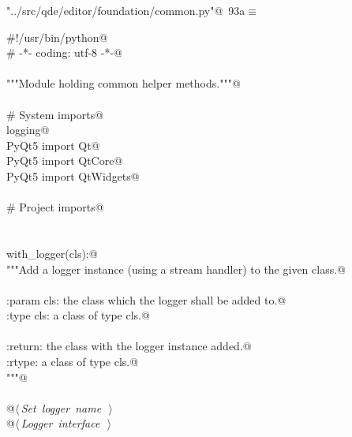 \documentclass[
    a4paper,      %
    10pt,         %
    openright,    %
    notitlepage,  %
    parskip=half, %
]{scrreprt}       %
\theoremstyle{definition}                    %
\begin{document}
\begin{flushleft} \small
\begin{minipage}{\linewidth}\label{scrap148}\raggedright\small
{} \verb@"../src/qde/editor/foundation/common.py"@\nobreak\ {\footnotesize {93a}}$\equiv$
\vspace{-1ex}
\begin{list}{}{} \item
\mbox{}\lstinline@#!/usr/bin/python@\\
\mbox{}\lstinline@# -*- coding: utf-8 -*-@\\
\mbox{}\lstinline@@\\
\mbox{}\lstinline@"""Module holding common helper methods."""@\\
\mbox{}\lstinline@@\\
\mbox{}\lstinline@# System imports@\\
\mbox{}\lstinline@import logging@\\
\mbox{}\lstinline@from PyQt5 import Qt@\\
\mbox{}\lstinline@from PyQt5 import QtCore@\\
\mbox{}\lstinline@from PyQt5 import QtWidgets@\\
\mbox{}\lstinline@@\\
\mbox{}\lstinline@# Project imports@\\
\mbox{}\lstinline@@\\
\mbox{}\lstinline@@\\
\mbox{}\lstinline@def with_logger(cls):@\\
\mbox{}\lstinline@    """Add a logger instance (using a stream handler) to the given class.@\\
\mbox{}\lstinline@@\\
\mbox{}\lstinline@    :param cls: the class which the logger shall be added to.@\\
\mbox{}\lstinline@    :type  cls: a class of type cls.@\\
\mbox{}\lstinline@@\\
\mbox{}\lstinline@    :return: the class with the logger instance added.@\\
\mbox{}\lstinline@    :rtype:  a class of type cls.@\\
\mbox{}\lstinline@    """@\\
\mbox{}\lstinline@@\\
\mbox{}\lstinline@    @\hbox{$\langle\,${\itshape Set logger name}\nobreak\ {\footnotesize {}}$\,\rangle$}\lstinline@@\\
\mbox{}\lstinline@    @\hbox{$\langle\,${\itshape Logger interface}\nobreak\ {\footnotesize {}}$\,\rangle$}\lstinline@@\\
\mbox{}\lstinline@@{\NWsep}
\end{list}
\vspace{-1.5ex}
\footnotesize
\begin{list}{}{\setlength{\itemsep}{-\parsep}\setlength{\itemindent}{-\leftmargin}}

\item{}
\end{list}
\end{minipage}\vspace{4ex}
\end{flushleft}
\end{document}
